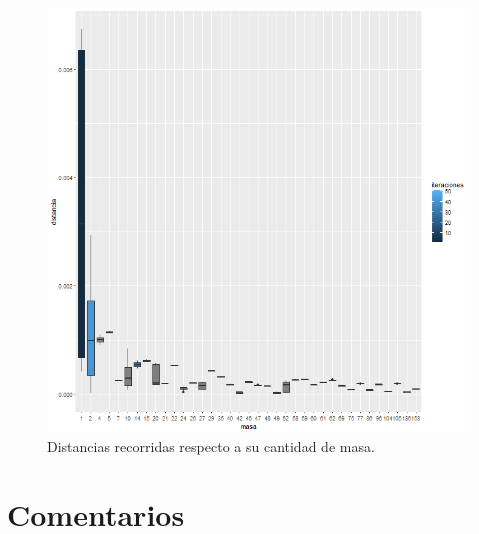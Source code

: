 \documentclass[a4paper]{article}
\begin{document}
\begin{figure}[h!]
\centering
\includegraphics[width=0.7\linewidth]{total}
\caption{Distancias recorridas respecto a su cantidad de masa.}
\label{fig:totalR}
\end{figure}

\section{Comentarios}
\end{document}
